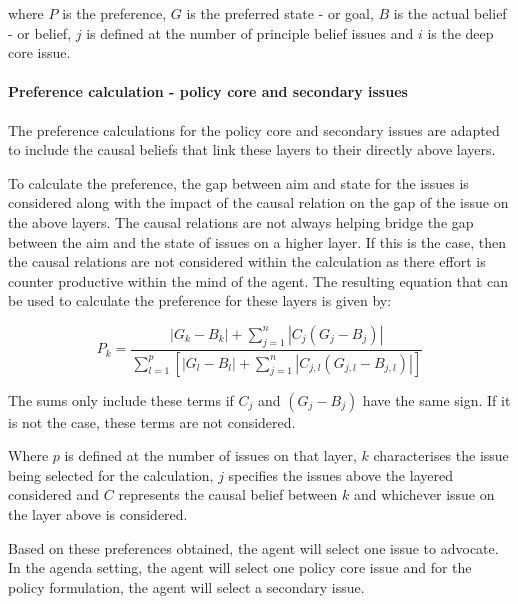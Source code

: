 \documentclass[11pt]{article}
\begin{document}
where $P$ is the preference, $G$ is the preferred state - or goal, $B$ is the actual belief - or belief, $j$ is defined at the number of principle belief issues and $i$ is the deep core issue.


\paragraph{Preference calculation - policy core and secondary issues}

The preference calculations for the policy core and secondary issues are adapted to include the causal beliefs that link these layers to their directly above layers.

To calculate the preference, the gap between aim and state for the issues is considered along with the impact of the causal relation on the gap of the issue on the above layers. The causal relations are not always helping bridge the gap between the aim and the state of issues on a higher layer. If this is the case, then the causal relations are not considered within the calculation as there effort is counter productive within the mind of the agent. The resulting equation that can be used to calculate the preference for these layers is given by:

\begin{equation}\label{eq:preference2}
P_k = \frac{ |G_k - B_k| + \sum_{j=1}^n |C_j \left( G_j - B_j \right)|}{\sum_{l=1}^p \left[ |G_l - B_l| + \sum_{j=1}^n \left|C_{j,l} \left( G_{j,l} - B_{j,l} \right) \right| \right]}
\end{equation}

The sums only include these terms if $C_j$ and $\left( G_j - B_j \right)$ have the same sign. If it is not the case, these terms are not considered.

Where $p$ is defined at the number of issues on that layer, $k$ characterises the issue being selected for the calculation, $j$ specifies the issues above the layered considered and $C$ represents the causal belief between $k$ and whichever issue on the layer above is considered.

Based on these preferences obtained, the agent will select one issue to advocate. In the agenda setting, the agent will select one policy core issue and for the policy formulation, the agent will select a secondary issue.

\end{document}
